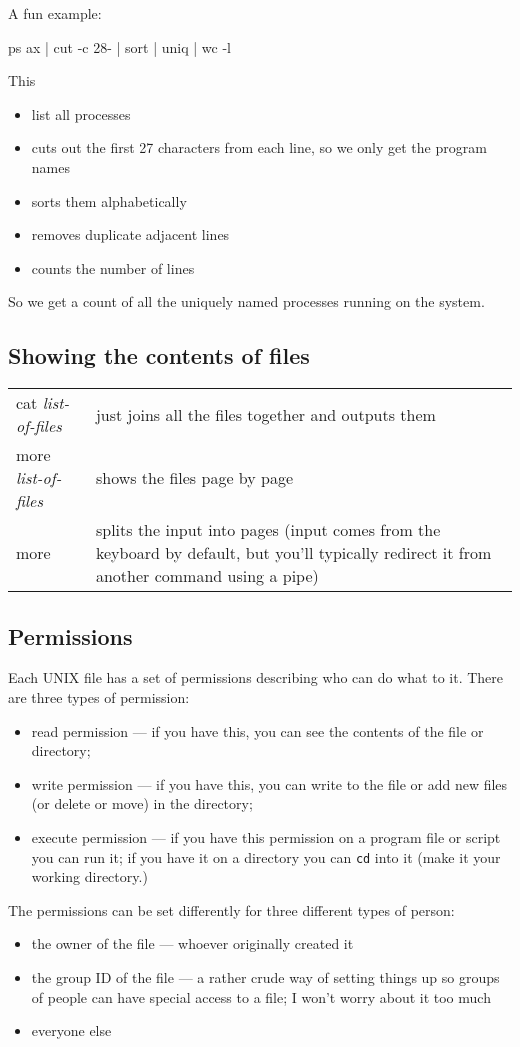 \documentclass[twocolumn]{article}
\begin{document}
A fun example:
\begin{v}
ps ax | cut -c 28- | sort | uniq | wc -l
\end{v}
This
\begin{itemize}
\item list all processes
\item cuts out the first 27 characters from each line, so we only
get the program names
\item sorts them alphabetically
\item removes duplicate adjacent lines
\item counts the number of lines
\end{itemize}
So we get a count of all the uniquely named processes running on the system.


\subsection{Showing the contents of files}
\begin{tabular}{l|p{2in}}
cat \emph{list-of-files} & just joins all the files together and outputs
them \\
more \emph{list-of-files} & shows the files page by page \\
more & splits the input into pages (input comes from the keyboard by
default, but you'll typically redirect it from another command using a pipe)
\end{tabular}


\subsection{Permissions}
Each UNIX file has a set of permissions describing who can do what to it.
There are three types of permission:
\begin{itemize}
\item read permission --- if you have this, you can see the contents of the
file or directory;
\item write permission --- if you have this, you can write to the file or
add new files (or delete or move) in the directory;
\item execute permission --- if you have this permission on a
program file or script you can run it; if you have it on a directory you
can \verb+cd+ into it (make it your working directory.)
\end{itemize}
The permissions can be set differently for three different types of person:
\begin{itemize}
\item the owner of the file --- whoever originally created it
\item the group ID of the file --- a rather crude way of setting things up
so groups of people can have special access to a file; I won't worry about it too much
\item everyone else
\end{itemize}
\end{document}
